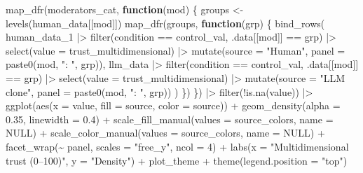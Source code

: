 \documentclass[
  letterpaper,
  DIV=11,
  numbers=noendperiod]{scrartcl}
\newenvironment{Shaded}{\begin{snugshade}}{\end{snugshade}}
\newcommand{\AttributeTok}[1]{\textcolor[rgb]{0.40,0.45,0.13}{#1}}
\newcommand{\ConstantTok}[1]{\textcolor[rgb]{0.56,0.35,0.01}{#1}}
\newcommand{\ControlFlowTok}[1]{\textcolor[rgb]{0.00,0.23,0.31}{\textbf{#1}}}
\newcommand{\DecValTok}[1]{\textcolor[rgb]{0.68,0.00,0.00}{#1}}
\newcommand{\FloatTok}[1]{\textcolor[rgb]{0.68,0.00,0.00}{#1}}
\newcommand{\FunctionTok}[1]{\textcolor[rgb]{0.28,0.35,0.67}{#1}}
\newcommand{\NormalTok}[1]{\textcolor[rgb]{0.00,0.23,0.31}{#1}}
\newcommand{\OtherTok}[1]{\textcolor[rgb]{0.00,0.23,0.31}{#1}}
\newcommand{\SpecialCharTok}[1]{\textcolor[rgb]{0.37,0.37,0.37}{#1}}
\newcommand{\StringTok}[1]{\textcolor[rgb]{0.13,0.47,0.30}{#1}}
\begin{document}
\begin{Shaded}
\begin{Highlighting}[]
\FunctionTok{map\_dfr}\NormalTok{(moderators\_cat, }\ControlFlowTok{function}\NormalTok{(mod) \{}
\NormalTok{  groups }\OtherTok{\textless{}{-}} \FunctionTok{levels}\NormalTok{(human\_data[[mod]])}
  \FunctionTok{map\_dfr}\NormalTok{(groups, }\ControlFlowTok{function}\NormalTok{(grp) \{}
    \FunctionTok{bind\_rows}\NormalTok{(}
\NormalTok{      human\_data\_1 }\SpecialCharTok{|\textgreater{}} \FunctionTok{filter}\NormalTok{(condition }\SpecialCharTok{==}\NormalTok{ control\_val, .data[[mod]] }\SpecialCharTok{==}\NormalTok{ grp) }\SpecialCharTok{|\textgreater{}}
        \FunctionTok{select}\NormalTok{(}\AttributeTok{value =}\NormalTok{ trust\_multidimensional) }\SpecialCharTok{|\textgreater{}}
        \FunctionTok{mutate}\NormalTok{(}\AttributeTok{source =} \StringTok{"Human"}\NormalTok{,     }\AttributeTok{panel =} \FunctionTok{paste0}\NormalTok{(mod, }\StringTok{": "}\NormalTok{, grp)),}
\NormalTok{      llm\_data     }\SpecialCharTok{|\textgreater{}} \FunctionTok{filter}\NormalTok{(condition }\SpecialCharTok{==}\NormalTok{ control\_val, .data[[mod]] }\SpecialCharTok{==}\NormalTok{ grp) }\SpecialCharTok{|\textgreater{}}
        \FunctionTok{select}\NormalTok{(}\AttributeTok{value =}\NormalTok{ trust\_multidimensional) }\SpecialCharTok{|\textgreater{}}
        \FunctionTok{mutate}\NormalTok{(}\AttributeTok{source =} \StringTok{"LLM clone"}\NormalTok{, }\AttributeTok{panel =} \FunctionTok{paste0}\NormalTok{(mod, }\StringTok{": "}\NormalTok{, grp))}
\NormalTok{    )}
\NormalTok{  \})}
\NormalTok{\}) }\SpecialCharTok{|\textgreater{}}
  \FunctionTok{filter}\NormalTok{(}\SpecialCharTok{!}\FunctionTok{is.na}\NormalTok{(value)) }\SpecialCharTok{|\textgreater{}}
  \FunctionTok{ggplot}\NormalTok{(}\FunctionTok{aes}\NormalTok{(}\AttributeTok{x =}\NormalTok{ value, }\AttributeTok{fill =}\NormalTok{ source, }\AttributeTok{color =}\NormalTok{ source)) }\SpecialCharTok{+}
  \FunctionTok{geom\_density}\NormalTok{(}\AttributeTok{alpha =} \FloatTok{0.35}\NormalTok{, }\AttributeTok{linewidth =} \FloatTok{0.4}\NormalTok{) }\SpecialCharTok{+}
  \FunctionTok{scale\_fill\_manual}\NormalTok{(}\AttributeTok{values  =}\NormalTok{ source\_colors, }\AttributeTok{name =} \ConstantTok{NULL}\NormalTok{) }\SpecialCharTok{+}
  \FunctionTok{scale\_color\_manual}\NormalTok{(}\AttributeTok{values =}\NormalTok{ source\_colors, }\AttributeTok{name =} \ConstantTok{NULL}\NormalTok{) }\SpecialCharTok{+}
  \FunctionTok{facet\_wrap}\NormalTok{(}\SpecialCharTok{\textasciitilde{}}\NormalTok{ panel, }\AttributeTok{scales =} \StringTok{"free\_y"}\NormalTok{, }\AttributeTok{ncol =} \DecValTok{4}\NormalTok{) }\SpecialCharTok{+}
  \FunctionTok{labs}\NormalTok{(}\AttributeTok{x =} \StringTok{"Multidimensional trust (0–100)"}\NormalTok{, }\AttributeTok{y =} \StringTok{"Density"}\NormalTok{) }\SpecialCharTok{+}
\NormalTok{  plot\_theme }\SpecialCharTok{+}
  \FunctionTok{theme}\NormalTok{(}\AttributeTok{legend.position =} \StringTok{"top"}\NormalTok{)}
\end{Highlighting}
\end{Shaded}
\end{document}
